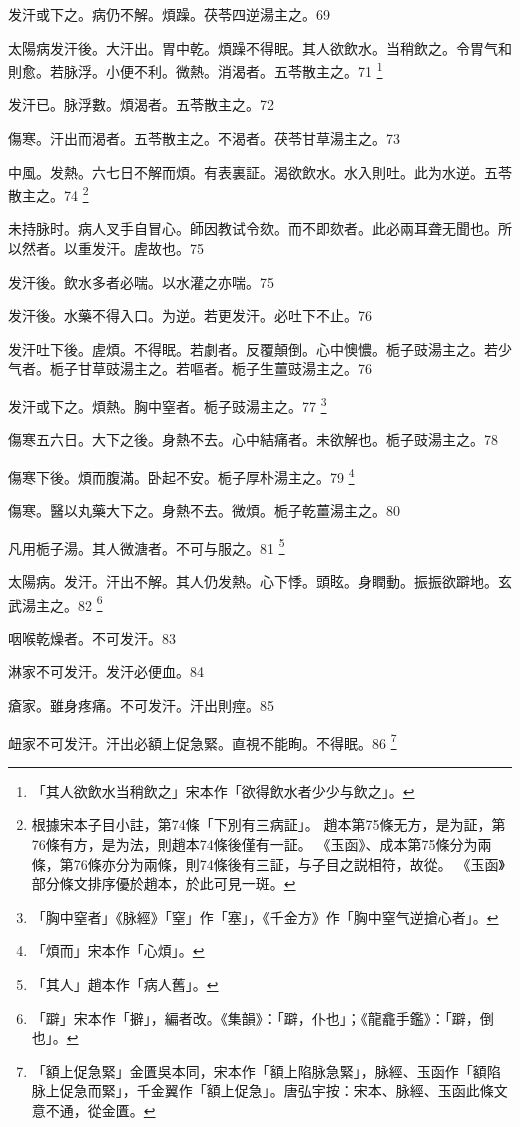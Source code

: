 发汗或下之。{\khaaitp 病仍}不解。煩躁。茯苓四逆湯主之。69

太陽病发汗後。大汗出。胃中乾。煩躁不得眠。其人欲飲水。当稍飲之。令胃气和則愈。若脉浮。小便不利。微熱。消渴者。五苓散主之。71
	\footnote{
		「其人欲飲水当稍飲之」宋本作「欲得飲水者少少与飲之」。
	}

发汗已。脉浮數。煩渴者。五苓散主之。72

傷寒。汗出而渴者。五苓散主之。不渴者。茯苓甘草湯主之。73

中風。发熱。六七日不解而煩。有表裏証。渴欲飲水。水入則吐。此为水逆。五苓散主之。74
	\footnote{
		根據宋本子目小註，第74條「下別有三病証」。
		趙本第75條无方，是为証，第76條有方，是为法，則趙本74條後僅有一証。
		《玉函》、成本第75條分为兩條，第76條亦分为兩條，則74條後有三証，与子目之説相符，故從。
		《玉函》部分條文排序優於趙本，於此可見一斑。
	}

未持脉时。病人叉手自冒心。師因教试令欬。而不即欬者。此必兩耳聋无聞也。所以然者。以重发汗。虗故也。75

发汗後。飲水多者必喘。以水灌之亦喘。75

发汗後。水藥不得入口。为逆。{\khaaitp 若更发汗。必吐下不止。}76

发汗吐下後。虗煩。不得眠。若劇者。反覆顛倒。心中懊憹。栀子{\khaaitp 豉}湯主之。若少气者。栀子甘草{\khaaitp 豉}湯主之。若嘔者。栀子生薑{\khaaitp 豉}湯主之。76

发汗或下之。煩熱。胸中窒者。栀子{\khaaitp 豉}湯主之。77
	\footnote{
		「胸中窒者」《脉經》「窒」作「塞」，《千金方》作「胸中窒气逆搶心者」。
	}

傷寒五六日。大下之後。身熱不去。心中結痛者。未欲解也。栀子{\khaaitp 豉}湯主之。78

傷寒下後。煩而腹滿。卧起不安。栀子厚朴湯主之。79
	\footnote{
		「煩而」宋本作「心煩」。
	}

傷寒。醫以丸藥大下之。身熱不去。微煩。栀子乾薑湯主之。80

凡用栀子湯。其人微溏者。不可与服之。81
	\footnote{
		「其人」趙本作「病人舊」。
	}

太陽病。发汗。汗出不解。其人仍发熱。心下悸。頭眩。身瞤動。振振欲躃地。玄武湯主之。82
	\footnote{
		「躃」宋本作「擗」，編者改。《集韻》：「躃，仆也」；《龍龕手鑑》：「躃，倒也」。
	}

咽喉乾燥者。不可发汗。83

淋家不可发汗。发汗必便血。84

瘡家。雖身疼痛。不可发汗。汗出則痙。85

衄家不可发汗。汗出必額上促急{\khaaitp 緊}。直視不能眴。不得眠。86
	\footnote{
		「額上促急緊」金匱吳本同，宋本作「額上陷脉急緊」，脉經、玉函作「額陷脉上促急而緊」，千金翼作「額上促急」。唐弘宇按：宋本、脉經、玉函此條文意不通，從金匱。
	}


